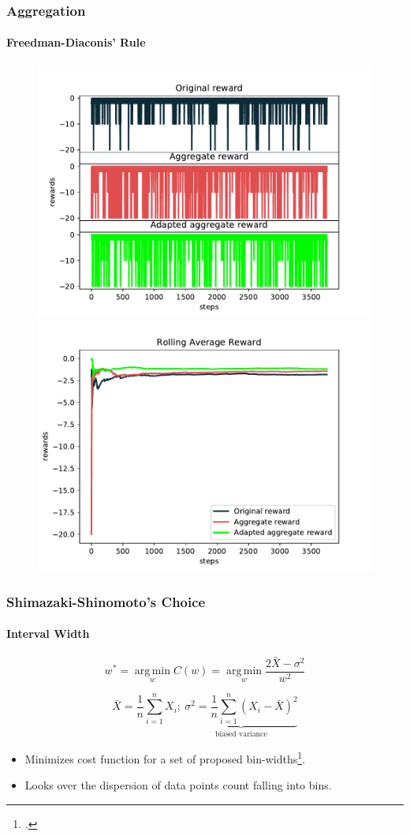 \documentclass[mathserif]{beamer}
\begin{document}
    \begin{frame}
        \frametitle{Aggregation}
        \framesubtitle{Freedman-Diaconis' Rule}

        \begin{figure}
            \label{fig:freedman-diaconis-rewards}
            \centering
            \includegraphics[width=0.46\columnwidth]{res/experiments/freedman-diaconis_steps_rewards.pdf}
            \qquad
            \includegraphics[width=0.46\columnwidth]{res/experiments/freedman-diaconis_rolling_rewards.pdf}
        \end{figure}

    \end{frame}


    \begin{frame}
        \frametitle{Shimazaki-Shinomoto's Choice}
        \framesubtitle{Interval Width}

        \begin{equation}
            \label{eq:shimazaki-rule}
            w^{*} = \operatorname*{arg\,min}_{w} C(w) = \operatorname*{arg\,min}_{w} \frac{2 \bar{X} - \sigma^{2}}{w^{2}}
        \end{equation}

        \[
            \bar{X} = \frac{1}{n} \sum_{i=1}^{n} X_{i}; \: \underbrace{\sigma^{2} = \frac{1}{n} \sum_{i=1}^{n} (X_{i} - \bar{X})^{2}}_{\text{biased variance}}
        \]

        \begin{itemize}
            \item Minimizes cost function for a set of proposed bin-widths\footcite{Shimazaki2007}.
            \item Looks over the dispersion of data points count falling into bins.
        \end{itemize}

    \end{frame}
\end{document}
